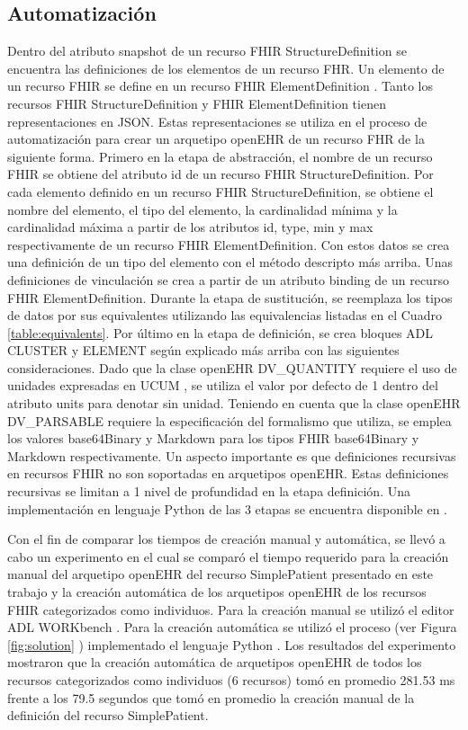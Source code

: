 \subsection{Automatización}

Dentro del atributo snapshot de un recurso FHIR StructureDefinition se encuentra las definiciones de los elementos de un recurso FHR. Un elemento de un recurso FHIR se define en un recurso FHIR ElementDefinition \cite{FHIRElementDefinition}. Tanto los recursos FHIR StructureDefinition y FHIR ElementDefinition tienen representaciones en JSON. Estas representaciones se utiliza en el proceso de automatización para crear un arquetipo openEHR de un recurso FHR de la siguiente forma. Primero en la etapa de abstracción, el nombre de un recurso FHIR se obtiene del atributo id de un recurso FHIR StructureDefinition. Por cada elemento definido en un recurso FHIR StructureDefinition, se obtiene el nombre del elemento, el tipo del elemento, la cardinalidad mínima y la cardinalidad máxima a partir de los atributos id, type, min y max respectivamente de un recurso FHIR ElementDefinition. Con estos datos se crea una definición de un tipo del elemento con el método descripto más arriba. Unas definiciones de vinculación se crea a partir de un atributo binding de un recurso FHIR ElementDefinition. Durante la etapa de sustitución, se reemplaza los tipos de datos por sus equivalentes utilizando las equivalencias listadas en el Cuadro \ref{table:equivalents}. Por último en la etapa de definición, se crea bloques ADL CLUSTER y ELEMENT según explicado más arriba con las siguientes consideraciones. Dado que la clase openEHR DV\_QUANTITY requiere el uso de unidades expresadas en UCUM \cite{UCUM}, se utiliza el valor por defecto de 1 dentro del atributo units para denotar sin unidad. Teniendo en cuenta que la clase openEHR DV\_PARSABLE requiere la especificación del formalismo que utiliza, se emplea los valores base64Binary y Markdown para los tipos FHIR base64Binary y Markdown respectivamente. Un aspecto importante es que definiciones recursivas en recursos FHIR no son soportadas en arquetipos openEHR. Estas definiciones recursivas se limitan a 1 nivel de profundidad en la etapa definición. Una implementación en lenguaje Python de las 3 etapas se encuentra disponible en \cite{PythonImplementation}.

Con el fin de comparar los tiempos de creación manual y automática, se llevó a cabo un experimento en el cual se comparó el tiempo requerido para la creación manual del arquetipo openEHR del recurso SimplePatient presentado en este trabajo  y la creación automática de los arquetipos openEHR de los recursos FHIR categorizados como individuos. Para la creación manual se utilizó el editor ADL WORKbench \cite{ADLWORKbench}. Para la creación automática se utilizó el proceso (ver Figura \ref{fig:solution} ) implementado el lenguaje Python \cite{PythonImplementation}. Los resultados del experimento mostraron que la creación automática de arquetipos openEHR de todos los recursos categorizados como individuos (6 recursos) tomó en promedio 281.53 ms frente a los 79.5 segundos que tomó en promedio la creación manual de la definición del recurso SimplePatient.
